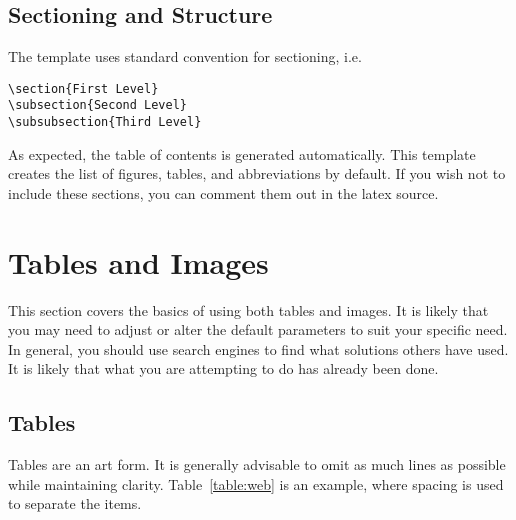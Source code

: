 \documentclass[english]{jamk-report}
\begin{document}
\subsection{Sectioning and Structure}

The template uses standard convention for sectioning, i.e. 

\begin{verbatim}
\section{First Level}
\subsection{Second Level}
\subsubsection{Third Level}
\end{verbatim}

\noindent
As expected, the table of contents is generated automatically. This template creates
the list of figures, tables, and abbreviations by default. If you wish not to include
these sections, you can comment them out in the latex source.

\section{Tables and Images}


This section covers the basics of using both tables and images. It is likely
that you may need to adjust or alter the default parameters to suit your
specific need. In general, you should use search
engines to find what solutions others have used. It is likely that
what you are attempting to do has already been done.

\subsection{Tables}

Tables are an art form. It is generally advisable to omit as much lines
as possible while maintaining clarity. Table~\ref{table:web} is an example,
where spacing is used to separate the items. 
\end{document}
